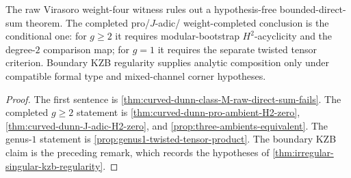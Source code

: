 \begin{corollary}
\label{cor:platonic-reconstitution-of-item-20}
The raw Virasoro weight-four witness rules out a hypothesis-free
bounded-direct-sum theorem. The completed pro/\(J\)-adic/
weight-completed conclusion is the conditional one: for \(g\ge2\)
it requires modular-bootstrap \(H^{2}\)-acyclicity and the
degree-\(2\) comparison map; for \(g=1\) it requires the separate
twisted tensor criterion. Boundary KZB regularity supplies analytic
composition only under compatible formal type and mixed-channel
corner hypotheses.
\end{corollary}

\begin{proof}
The first sentence is \autoref{thm:curved-dunn-class-M-raw-direct-sum-fails}.
The completed \(g\ge2\) statement is
\autoref{thm:curved-dunn-pro-ambient-H2-zero},
\autoref{thm:curved-dunn-J-adic-H2-zero}, and
\autoref{prop:three-ambients-equivalent}. The genus-\(1\) statement
is \autoref{prop:genus1-twisted-tensor-product}. The boundary KZB
claim is the preceding remark, which records the hypotheses of
\autoref{thm:irregular-singular-kzb-regularity}.
\end{proof}
